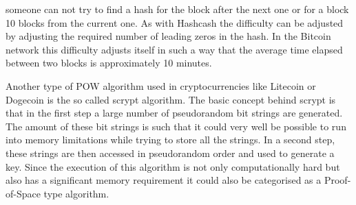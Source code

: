 someone can not try to find a hash for the block after the next one or for a block 10 blocks from the current one. As with Hashcash the difficulty can be adjusted by adjusting the required number
of leading zeros in the hash. In the Bitcoin network this difficulty adjusts itself in such a way that the average time elapsed between two blocks is approximately 10 minutes.\cite{url:bitcoin}\par
Another type of POW algorithm used in cryptocurrencies like Litecoin or Dogecoin is the so called scrypt algorithm.\cite{url:litecoin_dogecoin} The basic concept behind scrypt is that in the first 
step a large number of pseudorandom bit strings are generated. The amount of these bit strings is such that it could very well be possible to run into memory limitations while trying to store 
all the strings. In a second step, these strings are then accessed in pseudorandom order and used to generate a key. Since the execution of this algorithm is not only computationally hard but
also has a significant memory requirement it could also be categorised as a Proof-of-Space type algorithm.\cite{url:scrypt}
